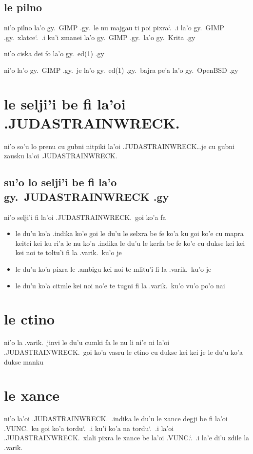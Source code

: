 \documentclass{report}
\newcommand\sds{\spacefactor\sfcode`.\ \space}
\begin{document}
\subsection{le pilno}
ni'o pilno la'o gy.\ GIMP .gy.\ le nu majgau ti poi pixra\sds  .i  la'o gy.\ GIMP .gy.\ xlatce\sds  .i ku'i zmanei la'o gy.\ GIMP .gy.\ la'o gy.\ Krita .gy

ni'o ciska dei fo la'o gy.\ ed(1) .gy

ni'o la'o gy.\ GIMP .gy.\ je la'o gy.\ ed(1) .gy.\ bajra pe'a la'o gy.\ OpenBSD .gy

\section{le selji'i be fi la'oi .JUDASTRAINWRECK.}
ni'o so'u lo prenu cu gubni nitpiki la'oi .JUDASTRAINWRECK\ldots je cu gubni zausku la'oi .JUDASTRAINWRECK.

\subsection{su'o lo selji'i be fi la'o gy.\ JUDASTRAINWRECK .gy}
ni'o selji'i fi la'oi .JUDASTRAINWRECK.\ goi ko'a fa
\begin{itemize}
	\item le du'u ko'a .indika ko'e goi le du'u le selxra be fe ko'a ku goi ko'e cu mapra keitci kei ku ri'a le nu ko'a .indika le du'u le kerfa be fe ko'e cu dukse kei kei kei noi te toltu'i fi la .varik.\ ku'o je
	\item le du'u ko'a pixra le .ambigu kei noi te mlitu'i fi la .varik.\ ku'o je
	\item le du'u ko'a citmle kei noi no'e te tugni fi la .varik.\ ku'o
vu'o po'o nai
\end{itemize}
\section{le ctino}
ni'o la .varik.\ jinvi le du'u cumki fa le nu li ni'e ni la'oi .JUDASTRAINWRECK.\ goi ko'a vasru le ctino cu dukse kei kei je le du'u ko'a dukse manku

\section{le xance}
ni'o la'oi .JUDASTRAINWRECK.\ .indika le du'u le xance degji be fi la'oi .VUNC.\ ku goi ko'a tordu\sds  .i ku'i ko'a na tordu\sds  .i la'oi .JUDASTRAINWRECK.\ xlali pixra le xance be la'oi .VUNC.\sds  .i la'e di'u zdile la .varik.
\end{document}
